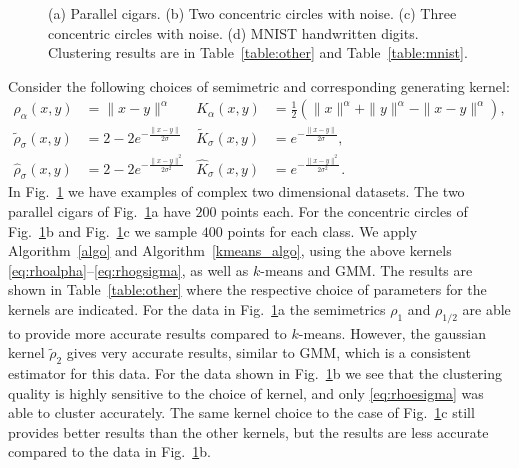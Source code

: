 \documentclass[aps,preprint,nofootinbib,floatfix]{revtex4-1}
\newcommand\kk{K}
\begin{document}
\begin{figure}
\begin{minipage}{0.23\textwidth}
\end{minipage}
\caption{\label{fig:other}
(a) Parallel cigars. (b) Two  
concentric circles with noise. (c) Three
concentric circles with noise. (d) MNIST handwritten digits.
Clustering results are in Table~\ref{table:other}
and Table~\ref{table:mnist}.
}
\end{figure}

Consider the following choices of semimetric and 
corresponding generating kernel:
\begin{align}
\rho_{\alpha}(x,y) &= \| x - y\|^\alpha & 
\kk_{\alpha}(x,y) &= \tfrac{1}{2}\left(
\| x \|^\alpha +
\| y \|^\alpha -
\| x-y \|^\alpha \right) ,
\label{eq:rhoalpha} \\
%
\widetilde{\rho}_{\sigma}(x,y) &= 2 - 2 e^{-\tfrac{\|x-y\|}{2 \sigma}} &
\widetilde{\kk}_{\sigma}(x,y) &= e^{-\tfrac{\|x-y\|}{2\sigma}} ,
\label{eq:rhoesigma} \\
%
\widehat{\rho}_{\sigma}(x,y) &= 2 - 2 e^{-\tfrac{\|x-y\|^2}{2 \sigma^2}} &
\widehat{\kk}_{\sigma}(x,y) &= e^{-\tfrac{\|x-y\|^2}{2\sigma^2}} .
\label{eq:rhogsigma} 
\end{align}
In Fig.~\ref{fig:other} we have examples of
complex two dimensional datasets. The two parallel cigars of 
Fig.~\ref{fig:other}a have $200$ points each. For the concentric circles
of Fig.~\ref{fig:other}b and Fig.~\ref{fig:other}c we
sample $400$ points for each class.
We apply Algorithm~\ref{algo} and Algorithm~\ref{kmeans_algo}, 
using the above kernels 
\eqref{eq:rhoalpha}--\eqref{eq:rhogsigma}, as well as
$k$-means and GMM. The results are shown
in Table~\ref{table:other} where the respective choice of parameters for the
kernels are indicated. For the data in Fig.~\ref{fig:other}a 
the semimetrics $\rho_1$ and $\rho_{1/2}$ are
able to provide more accurate results compared to $k$-means. However,
the gaussian kernel $\widetilde{\rho}_2$ gives very accurate
results, similar to GMM,
which is a consistent estimator for this data. For the data shown in
Fig.~\ref{fig:other}b we see
that the clustering quality is highly sensitive to the choice of kernel,
and only \eqref{eq:rhoesigma}
was able to cluster accurately. The same kernel choice to the case
of Fig.~\ref{fig:other}c
still provides better results than
the other kernels, but the results are less accurate 
compared to the data in Fig.~\ref{fig:other}b.
\end{document}

